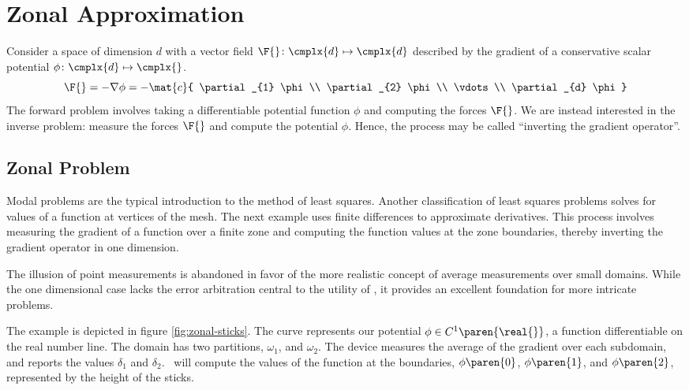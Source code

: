 \section{\label{sec:Zonal Approximation}Zonal Approximation}  
Consider a space of dimension $d$ with a vector field $\F{}\colon\cmplx{d}\mapsto\cmplx{d}$ described by the gradient of a conservative scalar potential $\phi\colon\cmplx{d}\mapsto\cmplx{}$.
%
\begin{equation}
	\F{} = -\nabla \phi = 
	-\mat{c}{	\partial_{1} \phi \\ 
			\partial_{2} \phi \\ 
			\vdots \\ 
			\partial_{d} \phi }
\end{equation}
%
The forward problem involves taking a differentiable potential function $\phi$ and computing the forces $\F{}$. We are instead interested in the inverse problem: measure the forces $\F{}$ and compute the potential $\phi$. Hence, the process may be called ``inverting the gradient operator''.

\subsection{\label{ssec:zonal solution}Zonal Problem}  
Modal problems are the typical introduction to the method of least squares. Another classification of least squares problems solves for values of a function at vertices of the mesh. The next example uses finite differences to approximate derivatives. This process involves measuring the gradient of a function over a finite zone and computing the function values at the zone boundaries, thereby inverting the gradient operator in one dimension.



The illusion of point measurements is abandoned in favor of the more realistic concept of average measurements over small domains. While the one dimensional case lacks the error arbitration central to the utility of \tmls, it provides an excellent foundation for more intricate problems.	

The example is depicted in figure \ref{fig:zonal-sticks}. The curve represents our potential $\phi\in C^{1}\paren{\real{}}$, a function differentiable on the real number line. The domain has two partitions, $\omega_1$, and $\omega_2$. The device measures the average of the gradient over each subdomain, and reports the values $\delta_{1}$ and $\delta_{2}$. \Tmls\ will compute the values of the function at the boundaries, $\phi\paren{0}$, $\phi\paren{1}$, and $\phi\paren{2}$, represented by the height of the sticks.

